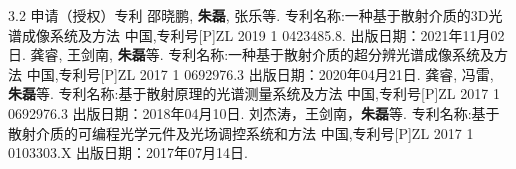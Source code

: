 \begin{resume}
\begin{resumelist}{\hspace{-0.25em}3.2\hspace{0.5em} 申请（授权）专利}
\resumelistitem 邵晓鹏, \textbf{朱磊}, 张乐等. 专利名称:一种基于散射介质的3D光谱成像系统及方法 中国,专利号[P]ZL 2019 1 0423485.8. 出版日期：2021年11月02日.
\resumelistitem 龚睿, 王剑南, \textbf{朱磊}等. 专利名称:一种基于散射介质的超分辨光谱成像系统及方法 中国,专利号[P]ZL 2017 1 0692976.3 出版日期：2020年04月21日.
\resumelistitem 龚睿, 冯雷, \textbf{朱磊}等. 专利名称:基于散射原理的光谱测量系统及方法 中国,专利号[P]ZL 2017 1 0692976.3 出版日期：2018年04月10日.
\resumelistitem 刘杰涛，王剑南，\textbf{朱磊}等. 专利名称:基于散射介质的可编程光学元件及光场调控系统和方法 中国,专利号[P]ZL 2017 1 0103303.X 出版日期：2017年07月14日.
\end{resumelist}

\end{resume}
